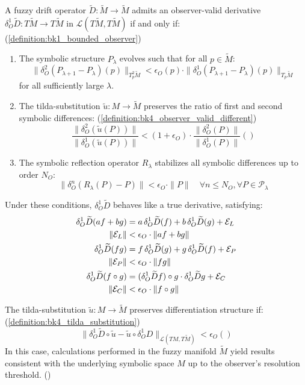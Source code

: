\begin{theorem} \label{thm:bk4_existence_observer_valid_derivatives}
A fuzzy drift operator $\widetilde{D}: \widetilde{M} \to \widetilde{M}$ admits an observer-valid derivative $\delta^1_O \widetilde{D}: T\widetilde{M} \to T\widetilde{M}$ in $\mathcal{L}(T\widetilde{M}, T\widetilde{M})$ if and only if: (\ref{definition:bk1_bounded_observer})
\begin{enumerate}
\item The symbolic structure $P_\lambda$ evolves such that for all $p \in \widetilde{M}$:
\[
\|\delta^2_O(P_{\lambda+1} - P_\lambda)(p)\|_{T^2_p\widetilde{M}} < \epsilon_O(p) \cdot \|\delta^1_O(P_{\lambda+1} - P_\lambda)(p)\|_{T_p\widetilde{M}}
\]
for all sufficiently large $\lambda$.
\item The tilda-substitution $\tilde{u}: M \to \widetilde{M}$ preserves the ratio of first and second symbolic differences: (\ref{definition:bk4_observer_valid_different})
\[
\frac{\|\delta^2_O(\tilde{u}(P))\|}{\|\delta^1_O(\tilde{u}(P))\|} < (1+\epsilon_O) \cdot \frac{\|\delta^2_O(P)\|}{\|\delta^1_O(P)\|} ()
\]
\item The symbolic reflection operator $R_\lambda$ stabilizes all symbolic differences up to order $N_O$:
\[
\|\delta^n_O(R_\lambda(P) - P)\| < \epsilon_O \cdot \|P\| \quad \forall n \leq N_O, \forall P \in \mathcal{P}_\lambda
\]
\end{enumerate}
Under these conditions, $\delta^1_O \widetilde{D}$ behaves like a true derivative, satisfying:
\begin{align}
\delta^1_O \widetilde{D}(af + bg) &= a\, \delta^1_O \widetilde{D}(f) + b\, \delta^1_O \widetilde{D}(g) + \mathcal{E}_L \\
\| \mathcal{E}_L \| &< \epsilon_O \cdot \| af + bg \| \notag \\
\delta^1_O \widetilde{D}(fg) &= f\, \delta^1_O \widetilde{D}(g) + g\, \delta^1_O \widetilde{D}(f) + \mathcal{E}_P \\
\| \mathcal{E}_P \| &< \epsilon_O \cdot \| fg \| \notag \\
\delta^1_O \widetilde{D}(f \circ g) &= (\delta^1_O \widetilde{D}f) \circ g \cdot \delta^1_O \widetilde{D}g + \mathcal{E}_C \\
\| \mathcal{E}_C \| &< \epsilon_O \cdot \| f \circ g \| \notag
\end{align}
\end{theorem}
\begin{corollary} \label{corollary:bk4_validity_of_tilda_substit}
The tilda-substitution $\tilde{u}: M \to \widetilde{M}$ preserves differentiation structure if: (\ref{definition:bk4_tilda_substitution})
\[
\|\delta^1_O \widetilde{D} \circ \tilde{u} - \tilde{u} \circ \delta^1_O D\|_{\mathcal{L}(TM, T\widetilde{M})} < \epsilon_O ()
\]
In this case, calculations performed in the fuzzy manifold $\widetilde{M}$ yield results consistent with the underlying symbolic space $M$ up to the observer's resolution threshold. ()
\end{corollary}
